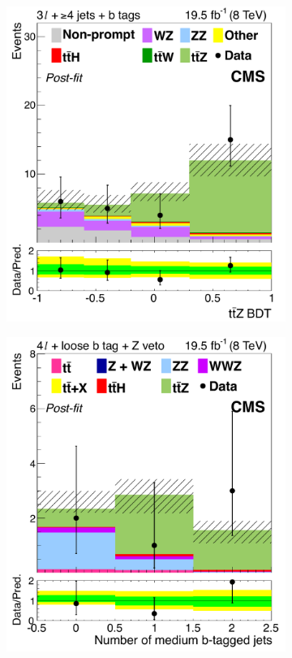 \begin{figure}[tb]
\begin{subfigure}{0.33\textwidth}
    \caption{}
    \label{sfig:8-ttZ-bl}
  \end{subfigure}%
  \begin{subfigure}{0.33\textwidth}
    \includegraphics[width=\textwidth]{figures/eight-TeV/mva/3l_ge4j_bloose_FinalBDT}
    \caption{}
  \end{subfigure}%
  \begin{subfigure}{0.33\textwidth}
    \includegraphics[width=\textwidth]{figures/eight-TeV/mva/4l_ge1j_Zmask_mht30_1bloose_numMediumBJets}

\end{subfigure}
\end{figure}
